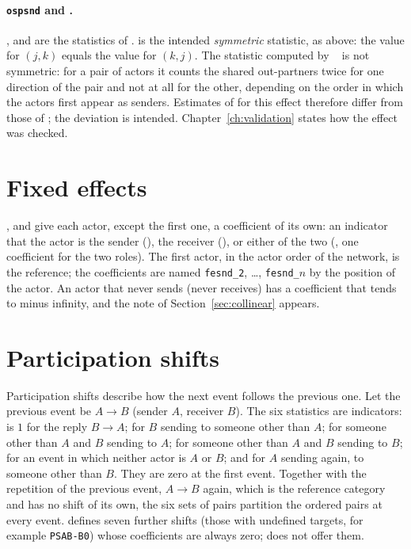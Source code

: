 \paragraph{\texttt{ospsnd} and \relevent{}.} ,  and  are the statistics of \relevent{}.  is the intended \emph{symmetric} statistic, as above: the value for $(j,k)$ equals the value for $(k,j)$. The statistic computed by \relevent{}~\releventver{} is not symmetric: for a pair of actors it counts the shared out-partners twice for one direction of the pair and not at all for the other, depending on the order in which the actors first appear as senders. Estimates of \nwrem{} for this effect therefore differ from those of \relevent{}; the deviation is intended. Chapter~\ref{ch:validation} states how the effect was checked.

\section{Fixed effects}

,  and  give each actor, except the first one, a coefficient of its own: an indicator that the actor is the sender (), the receiver (), or either of the two (, one coefficient for the two roles). The first actor, in the actor order of the network, is the reference; the coefficients are named \texttt{fesnd\_2}, \dots, \texttt{fesnd\_}$n$ by the position of the actor. An actor that never sends (never receives) has a coefficient that tends to minus infinity, and the note of Section~\ref{sec:collinear} appears.

\section{Participation shifts}\label{sec:ps}

Participation shifts describe how the next event follows the previous one. Let the previous event be $A\to B$ (sender $A$, receiver $B$). The six statistics are indicators:  is $1$ for the reply $B\to A$;  for $B$ sending to someone other than $A$;  for someone other than $A$ and $B$ sending to $A$;  for someone other than $A$ and $B$ sending to $B$;  for an event in which neither actor is $A$ or $B$; and  for $A$ sending again, to someone other than $B$. They are zero at the first event. Together with the repetition of the previous event, $A\to B$ again, which is the reference category and has no shift of its own, the six sets of pairs partition the ordered pairs at every event. \relevent{} defines seven further shifts (those with undefined targets, for example \texttt{PSAB-B0}) whose coefficients are always zero; \nwrem{} does not offer them.

